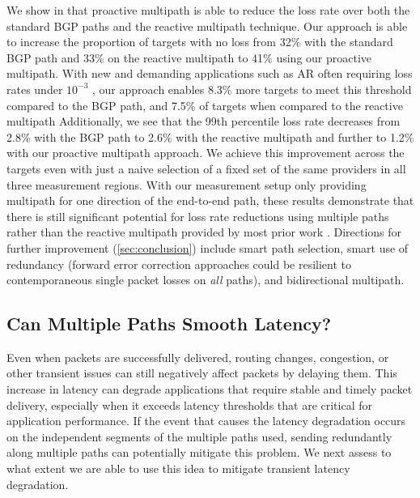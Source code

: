 \documentclass[sigconf,nonacm,screen,letterpaper,10pt]{acmart}
\begin{document}
We show in  that proactive multipath is able to
reduce the loss rate over both the standard BGP paths and the reactive
multipath technique. Our approach is able to increase the proportion of
targets with no loss from 32\% with the standard BGP path and 33\% on
the reactive multipath to 41\% using our proactive multipath. With new
and demanding applications such as AR often requiring loss rates under
\(10^{-3}\) \cite{3gpp-app-reqs}, our approach enables 8.3\% more
targets to meet this threshold compared to the BGP path, and 7.5\% of
targets when compared to the reactive multipath Additionally, we see
that the 99th percentile loss rate decreases from 2.8\% with the BGP
path to 2.6\% with the reactive multipath and further to 1.2\% with our
proactive multipath approach. We achieve this improvement across the
targets even with just a naive selection of a fixed set of the same
providers in all three measurement regions. With our measurement setup
only providing multipath for one direction of the end-to-end path, these
results demonstrate that there is still significant potential for loss
rate reductions using multiple paths rather than the reactive multipath
provided by most prior work
\cite{akella-multihoming-nsdi-04, internap, edge-fabric, espresso, fastly-egress, painter, entact, cascara}.
Directions for further improvement (\cref{sec:conclusion}) include smart
path selection, smart use of redundancy (\eg forward error correction
approaches could be resilient to contemporaneous single packet losses on
\emph{all} paths), and bidirectional multipath.

\hypertarget{can-multiple-paths-smooth-latency}{%
\subsection{Can Multiple Paths Smooth
Latency?}\label{can-multiple-paths-smooth-latency}}

\label{sec:latency} Even when packets are successfully delivered,
routing changes, congestion, or other transient issues can still
negatively affect packets by delaying them. This increase in latency can
degrade applications that require stable and timely packet delivery,
especially when it exceeds latency thresholds that are critical for
application performance. If the event that causes the latency
degradation occurs on the independent segments of the multiple paths
used, sending redundantly along multiple paths can potentially mitigate
this problem. We next assess to what extent we are able to use this idea
to mitigate transient latency degradation.
\end{document}
